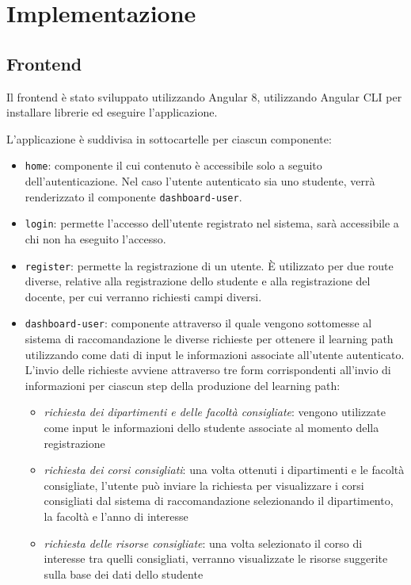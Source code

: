 \clearpage{\pagestyle{empty}\cleardoublepage}
\chapter{Implementazione}                %
\section{Frontend}
Il frontend è stato sviluppato utilizzando Angular 8, utilizzando Angular CLI per installare librerie ed eseguire l'applicazione.

L'applicazione è suddivisa in sottocartelle per ciascun componente:
\begin{itemize}
	\item \texttt{home}: componente il cui contenuto è accessibile solo a seguito dell'autenticazione. Nel caso l'utente autenticato sia uno studente, verrà renderizzato il componente \texttt{dashboard-user}.
	\item \texttt{login}: permette l'accesso dell'utente registrato nel sistema, sarà accessibile a chi non ha eseguito l'accesso.
	\item \texttt{register}: permette la registrazione di un utente. È utilizzato per due route diverse, relative alla registrazione dello studente e alla registrazione del docente, per cui verranno richiesti campi diversi.
	\item \texttt{dashboard-user}: componente attraverso il quale vengono sottomesse al sistema di raccomandazione le diverse richieste per ottenere il learning path utilizzando come dati di input le informazioni associate all'utente autenticato. L'invio delle richieste avviene attraverso tre form corrispondenti all'invio di informazioni per ciascun step della produzione del learning path:
\begin{itemize}
\item \textit{richiesta dei dipartimenti e delle facoltà consigliate}: vengono utilizzate come input le informazioni dello studente associate al momento della registrazione
\item \textit{richiesta dei corsi consigliati}: una volta ottenuti i dipartimenti e le facoltà consigliate, l'utente può inviare la richiesta per visualizzare i corsi consigliati dal sistema di raccomandazione selezionando il dipartimento, la facoltà e l'anno di interesse
\item \textit{richiesta delle risorse consigliate}: una volta selezionato il corso di interesse tra quelli consigliati, verranno visualizzate le risorse suggerite sulla base dei dati dello studente

\end{itemize}
\end{itemize}
